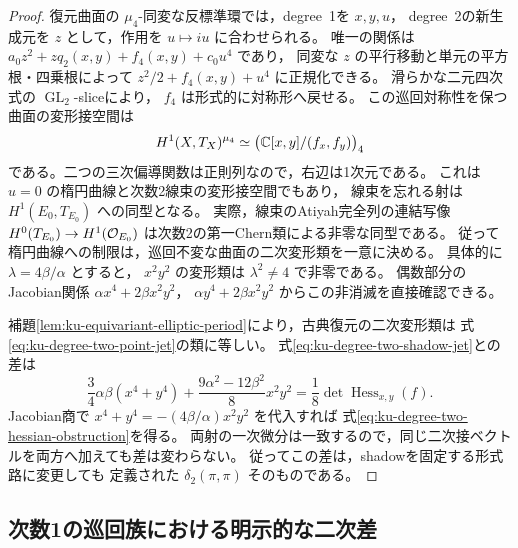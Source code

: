 \begin{proof}
復元曲面の $\mu_4$-同変な反標準環では，degree~1を $x,y,u$，
degree~2の新生成元を $z$ として，作用を $u\mapsto iu$ に合わせられる。
唯一の関係は
$a_0z^2+zq_2(x,y)+f_4(x,y)+c_0u^4$ であり，
同変な $z$ の平行移動と単元の平方根・四乗根によって
$z^2/2+f_4(x,y)+u^4$ に正規化できる。
滑らかな二元四次式の $\operatorname{GL}_2$-sliceにより，
$f_4$ は形式的に対称形へ戻せる。
この巡回対称性を保つ曲面の変形接空間は
\[
 H^1(X,T_X)^{\mu_4}
 \simeq\bigl(\mathbb C[x,y]/(f_x,f_y)\bigr)_4
\]
である。二つの三次偏導関数は正則列なので，右辺は1次元である。
これは $u=0$ の楕円曲線と次数2線束の変形接空間でもあり，
線束を忘れる射は $H^1(E_0,T_{E_0})$ への同型となる。
実際，線束のAtiyah完全列の連結写像
$H^0(T_{E_0})\to H^1(\mathcal O_{E_0})$ は次数2の第一Chern類による非零な同型である。
従って楕円曲線への制限は，巡回不変な曲面の二次変形類を一意に決める。
具体的に $\lambda=4\beta/\alpha$ とすると，
$x^2y^2$ の変形類は $\lambda^2\ne4$ で非零である。
偶数部分のJacobian関係 $\alpha x^4+2\beta x^2y^2$，
$\alpha y^4+2\beta x^2y^2$ からこの非消滅を直接確認できる。

補題\ref{lem:ku-equivariant-elliptic-period}により，古典復元の二次変形類は
式\eqref{eq:ku-degree-two-point-jet}の類に等しい。
式\eqref{eq:ku-degree-two-shadow-jet}との差は
\[
 \frac34\alpha\beta(x^4+y^4)
       +\frac{9\alpha^2-12\beta^2}{8}x^2y^2
   =\frac18\det\operatorname{Hess}_{x,y}(f).
\]
Jacobian商で $x^4+y^4=-(4\beta/\alpha)x^2y^2$ を代入すれば
式\eqref{eq:ku-degree-two-hessian-obstruction}を得る。
両射の一次微分は一致するので，同じ二次接ベクトルを両方へ加えても差は変わらない。
従ってこの差は，shadowを固定する形式路に変更しても
定義された $\delta_2(\pi,\pi)$ そのものである。
\end{proof}

\subsection{次数1の巡回族における明示的な二次差}

